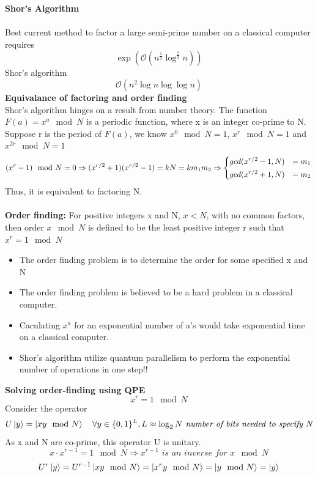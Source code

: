 \documentclass[]{article}
\theoremstyle{nonumberplain}
\begin{document}
\textbf{Shor's Algorithm} \\
\ \\
Best current method to factor a large semi-prime number on a classical computer requires  
\[
	\exp{\left(\mathcal{O}(n^{\frac{1}{3}}\log^{\frac{2}{3}}{n})\right)}
\] 
Shor's algorithm
\[
	\mathcal{O}(n^{2}\log{n}\log{\log{n}})
\] 
\textbf{Equivalance of factoring and order finding}\\
Shor's algorithm hinges on a result from number theory. The function $F(a)=x^{a} \mod{N}$ is a periodic function, where x is an integer co-prime to N.\\
Suppose r is the period of $F(a)$, we know $x^{0}\mod{N}=1$, $x^{r} \mod{N} = 1$ and $x^{2r}\mod{N}=1$
\[
	(x^{r}-1)\mod{N} = 0 \Rightarrow (x^{r/2}+1)(x^{r/2}-1) = kN = km_{1}m_{2}\Rightarrow 
\begin{aligned}
\begin{dcases}
	gcd(x^{r/2}-1,N) &= m_{1} \\
	gcd(x^{r/2}+1,N) &= m_{2} \\
\end{dcases}
\end{aligned}
\] 
Thus, it is equivalent to factoring N. \\
\newpage
\ \\
\textbf{Order finding:} For positive integers x and N, $x<N$, with no common factors, then order $x\mod{N}$ is defined to be the least positive integer r such that  $x^{r}=1\mod{N}$
\begin{itemize}
	\item The order finding problem is to determine the order for some specified x and N
	\item The order finding problem is believed to be a hard problem in a classical computer.
	\item Caculating $x^{a}$ for an exponential number of a's would take exponential time on a classical computer.
	\item Shor's algorithm utilize quantum parallelism to perform the exponential number of operations in one step!! 
\end{itemize}
\textbf{Solving order-finding using QPE} \ \\
\[
	x^{r}=1 \mod{N}
\] 
Consider the operator 
\[
	U\ket{y}=\ket{xy\mod{N}}\quad \forall y\in\{0,1\}^{L}, L \approx \log_{2}{N}\textit{ number of bits needed to specify N} 
\] 
As x and N are co-prime, this operator U is unitary.
\[
	x\cdot x^{r-1} = 1 \mod{N} \Rightarrow x^{r-1}\textit{ is an inverse for $x\mod{N}$}
\] 
\[
	U^{r}\ket{y}=U^{r-1}\ket{xy\mod{N}} = \ket{x^{r}y\mod{N}} = \ket{y\mod{N}} = \ket{y}
\] 
\end{document}

